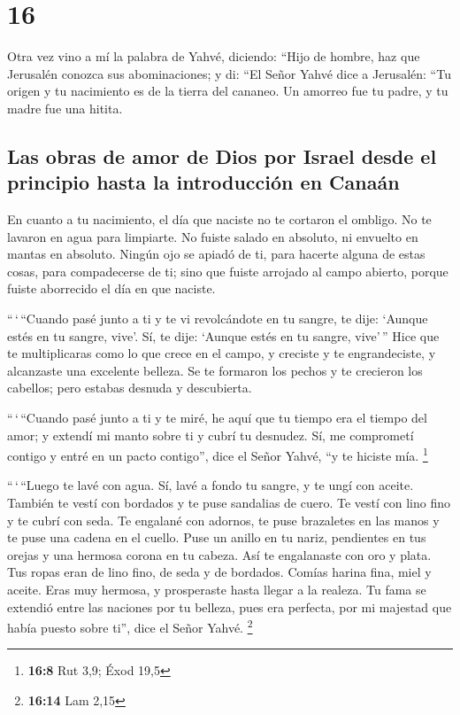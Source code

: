 \hypertarget{section-15}{%
\section{16}\label{section-15}}

 Otra vez vino a mí la palabra de Yahvé, diciendo:
 ``Hijo de hombre, haz que Jerusalén conozca sus
abominaciones;  y di: ``El Señor Yahvé dice a Jerusalén:
``Tu origen y tu nacimiento es de la tierra del cananeo. Un amorreo fue
tu padre, y tu madre fue una hitita.

\hypertarget{las-obras-de-amor-de-dios-por-israel-desde-el-principio-hasta-la-introducciuxf3n-en-canauxe1n}{%
\subsection{Las obras de amor de Dios por Israel desde el principio
hasta la introducción en
Canaán}\label{las-obras-de-amor-de-dios-por-israel-desde-el-principio-hasta-la-introducciuxf3n-en-canauxe1n}}

 En cuanto a tu nacimiento, el día que naciste no te
cortaron el ombligo. No te lavaron en agua para limpiarte. No fuiste
salado en absoluto, ni envuelto en mantas en absoluto. 
Ningún ojo se apiadó de ti, para hacerte alguna de estas cosas, para
compadecerse de ti; sino que fuiste arrojado al campo abierto, porque
fuiste aborrecido el día en que naciste.

 ``\,`\,``Cuando pasé junto a ti y te vi revolcándote en
tu sangre, te dije: `Aunque estés en tu sangre, vive'. Sí, te dije:
`Aunque estés en tu sangre, vive'\,''  Hice que te
multiplicaras como lo que crece en el campo, y creciste y te
engrandeciste, y alcanzaste una excelente belleza. Se te formaron los
pechos y te crecieron los cabellos; pero estabas desnuda y descubierta.

 ``\,`\,``Cuando pasé junto a ti y te miré, he aquí que tu
tiempo era el tiempo del amor; y extendí mi manto sobre ti y cubrí tu
desnudez. Sí, me comprometí contigo y entré en un pacto contigo'', dice
el Señor Yahvé, ``y te hiciste mía. \footnote{\textbf{16:8} Rut 3,9;
  Éxod 19,5}

 ``\,`\,``Luego te lavé con agua. Sí, lavé a fondo tu
sangre, y te ungí con aceite.  También te vestí con
bordados y te puse sandalias de cuero. Te vestí con lino fino y te cubrí
con seda.  Te engalané con adornos, te puse brazaletes en
las manos y te puse una cadena en el cuello.  Puse un
anillo en tu nariz, pendientes en tus orejas y una hermosa corona en tu
cabeza.  Así te engalanaste con oro y plata. Tus ropas
eran de lino fino, de seda y de bordados. Comías harina fina, miel y
aceite. Eras muy hermosa, y prosperaste hasta llegar a la realeza.
 Tu fama se extendió entre las naciones por tu belleza,
pues era perfecta, por mi majestad que había puesto sobre ti'', dice el
Señor Yahvé. \footnote{\textbf{16:14} Lam 2,15}

